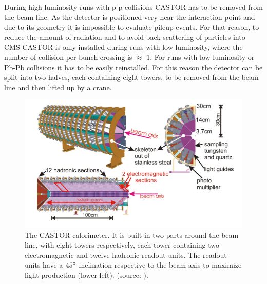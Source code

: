 During high luminosity runs with p-p collisions CASTOR has to be removed from the beam line. As the detector is positioned very near the interaction point and due to its geometry it is impossible to evaluate pileup events. For that reason, to reduce the amount of radiation and to avoid back scattering of particles into CMS CASTOR is only installed during runs with low luminosity, where the number of collision per bunch crossing is $\approx$ 1. For runs with low luminosity or Pb-Pb collisions it has to be easily reinstalled. For this reason the detector can be split into two halves, each containing eight towers, to be removed from the beam line and then lifted up by a crane. \cite{castor}

\begin{figure}
\centering
\includegraphics[scale=0.8]{castor.png}
\caption{The CASTOR	calorimeter. It is built in two parts around the beam line, with eight towers respectively, each tower containing two electromagnetic and twelve hadronic readout units. The readout units have a $45\degree$ inclination respective to the beam axis to maximize light production (lower left). (source: \cite{castorbild}).}
\end{figure}
